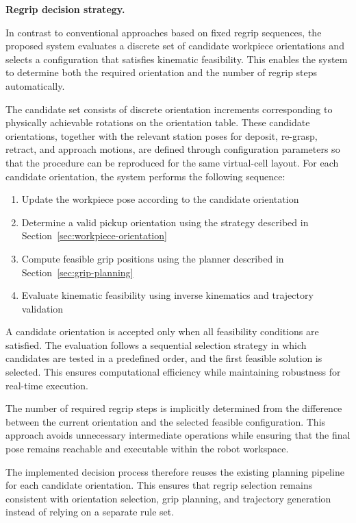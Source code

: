 \label{sec:regrip-decision-strategy}
\noindent\textbf{Regrip decision strategy.}

In contrast to conventional approaches based on fixed regrip sequences, the proposed system evaluates a discrete set of candidate workpiece orientations and selects a configuration that satisfies kinematic feasibility. This enables the system to determine both the required orientation and the number of regrip steps automatically.

The candidate set consists of discrete orientation increments corresponding to physically achievable rotations on the orientation table. These candidate orientations, together with the relevant station poses for deposit, re-grasp, retract, and approach motions, are defined through configuration parameters so that the procedure can be reproduced for the same virtual-cell layout. For each candidate orientation, the system performs the following sequence:

\begin{enumerate}
\item Update the workpiece pose according to the candidate orientation
\item Determine a valid pickup orientation using the strategy described in Section~\ref{sec:workpiece-orientation}
\item Compute feasible grip positions using the planner described in Section~\ref{sec:grip-planning}
\item Evaluate kinematic feasibility using inverse kinematics and trajectory validation
\end{enumerate}

A candidate orientation is accepted only when all feasibility conditions are satisfied. The evaluation follows a sequential selection strategy in which candidates are tested in a predefined order, and the first feasible solution is selected. This ensures computational efficiency while maintaining robustness for real-time execution.

The number of required regrip steps is implicitly determined from the difference between the current orientation and the selected feasible configuration. This approach avoids unnecessary intermediate operations while ensuring that the final pose remains reachable and executable within the robot workspace.

The implemented decision process therefore reuses the existing planning pipeline for each candidate orientation. This ensures that regrip selection remains consistent with orientation selection, grip planning, and trajectory generation instead of relying on a separate rule set.

